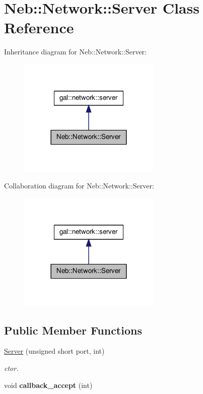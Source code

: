 \hypertarget{classNeb_1_1Network_1_1Server}{\section{\-Neb\-:\-:\-Network\-:\-:\-Server \-Class \-Reference}
\label{classNeb_1_1Network_1_1Server}
}


\-Inheritance diagram for \-Neb\-:\-:\-Network\-:\-:\-Server\-:\nopagebreak
\begin{figure}[H]
\begin{center}
\leavevmode
\includegraphics[width=192pt]{classNeb_1_1Network_1_1Server__inherit__graph}
\end{center}
\end{figure}


\-Collaboration diagram for \-Neb\-:\-:\-Network\-:\-:\-Server\-:\nopagebreak
\begin{figure}[H]
\begin{center}
\leavevmode
\includegraphics[width=192pt]{classNeb_1_1Network_1_1Server__coll__graph}
\end{center}
\end{figure}
\subsection*{\-Public \-Member \-Functions}
\begin{DoxyCompactItemize}
\item 
\hyperlink{classNeb_1_1Network_1_1Server_ad2765c53f9635c10ff316f3d985ab67d}{\-Server} (unsigned short port, int)
\begin{DoxyCompactList}\small\item\em ctor. \end{DoxyCompactList}\item 
\hypertarget{classNeb_1_1Network_1_1Server_aabb7f6cbe353b0ae3f9479e7d3745055}{void {\bfseries callback\-\_\-accept} (int)}\label{classNeb_1_1Network_1_1Server_aabb7f6cbe353b0ae3f9479e7d3745055}

\end{DoxyCompactItemize}


